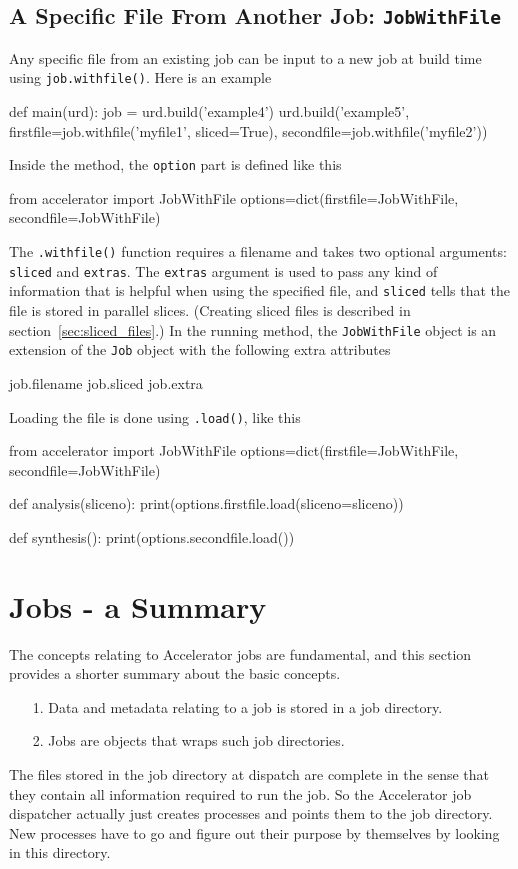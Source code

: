 \subsection{A Specific File From Another Job:  \texttt{JobWithFile}}
\label{sec:jobwithfile}
Any specific file from an existing job can be input to a new job at
build time using \texttt{job.withfile()}.  Here is an example
\begin{python}
def main(urd):
    job = urd.build('example4')
    urd.build('example5',
              firstfile=job.withfile('myfile1', sliced=True),
              secondfile=job.withfile('myfile2'))
\end{python}
Inside the method, the \texttt{option} part is defined like this
\begin{python}
from accelerator import JobWithFile
options=dict(firstfile=JobWithFile, secondfile=JobWithFile)
\end{python}
The \texttt{.withfile()} function requires a filename and takes two
optional arguments: \texttt{sliced} and \texttt{extras}.  The
\texttt{extras} argument is used to pass any kind of information that
is helpful when using the specified file, and \texttt{sliced} tells
that the file is stored in parallel slices.  (Creating sliced files is
described in section~\ref{sec:sliced_files}.)  In the
running method, the \texttt{JobWithFile} object is an extension of the
\texttt{Job} object with the following extra attributes
\begin{python}
job.filename
job.sliced
job.extra
\end{python}
Loading the file is done using \texttt{.load()}, like this
\begin{python}
from accelerator import JobWithFile
options=dict(firstfile=JobWithFile, secondfile=JobWithFile)

def analysis(sliceno):
    print(options.firstfile.load(sliceno=sliceno))

def synthesis():
    print(options.secondfile.load())
\end{python}



\section{Jobs - a Summary}
The concepts relating to Accelerator jobs are fundamental, and this
section provides a shorter summary about the basic concepts.

\begin{itemize}
\item[1.]  Data and metadata relating to a job is stored in a
job directory.
\item[2.]  Jobs are objects that wraps such job directories.
\end{itemize}
The files stored in the job directory at dispatch are complete in the
sense that they contain all information required to run the job.  So
the Accelerator job dispatcher actually just creates processes and
points them to the job directory.  New processes have to go and figure
out their purpose by themselves by looking in this directory.

